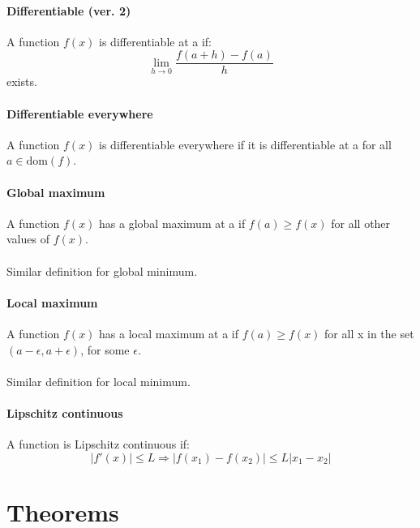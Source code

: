 \documentclass{article}
\begin{document}
\paragraph{Differentiable (ver. 2)}
A function $ f(x) $ is differentiable at a if:
\begin{equation}
\lim_{h \to 0}\frac{f(a + h) - f(a)}{h}
\end{equation}
exists.
\paragraph{Differentiable everywhere}
A function $ f(x) $ is differentiable everywhere if it is differentiable at a for all $ a \in \textrm{dom}(f) $.
\paragraph{Global maximum}
A function $ f(x) $ has a global maximum at a if $ f(a) \geq f(x) $ for all other values of $ f(x) $.
\\\\
Similar definition for global minimum.
\paragraph{Local maximum}
A function $ f(x) $ has a local maximum at a if $ f(a) \geq f(x) $ for all x in the set $ (a - \epsilon, a + \epsilon) $, for some $ \epsilon $.
\\\\
Similar definition for local minimum.
\paragraph{Lipschitz continuous}
A function is Lipschitz continuous if:
\begin{equation}
|f'(x)| \leq L \Rightarrow |f(x_{1}) - f(x_{2})| \leq L|x_{1} - x_{2}|
\end{equation}

\section{Theorems}
\end{document}
